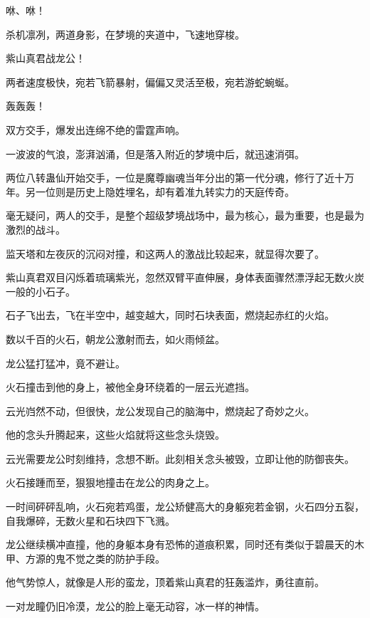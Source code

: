 
\begin{this_body}



咻、咻！

杀机凛冽，两道身影，在梦境的夹道中，飞速地穿梭。

紫山真君战龙公！

两者速度极快，宛若飞箭暴射，偏偏又灵活至极，宛若游蛇蜿蜒。

轰轰轰！

双方交手，爆发出连绵不绝的雷霆声响。

一波波的气浪，澎湃汹涌，但是落入附近的梦境中后，就迅速消弭。

两位八转蛊仙开始交手，一位是魔尊幽魂当年分出的第一代分魂，修行了近十万年。另一位则是历史上隐姓埋名，却有着准九转实力的天庭传奇。

毫无疑问，两人的交手，是整个超级梦境战场中，最为核心，最为重要，也是最为激烈的战斗。

监天塔和左夜灰的沉闷对撞，和这两人的激战比较起来，就显得次要了。

紫山真君双目闪烁着琉璃紫光，忽然双臂平直伸展，身体表面骤然漂浮起无数火炭一般的小石子。

石子飞出去，飞在半空中，越变越大，同时石块表面，燃烧起赤红的火焰。

数以千百的火石，朝龙公激射而去，如火雨倾盆。

龙公猛打猛冲，竟不避让。

火石撞击到他的身上，被他全身环绕着的一层云光遮挡。

云光岿然不动，但很快，龙公发现自己的脑海中，燃烧起了奇妙之火。

他的念头升腾起来，这些火焰就将这些念头烧毁。

云光需要龙公时刻维持，念想不断。此刻相关念头被毁，立即让他的防御丧失。

火石接踵而至，狠狠地撞击在龙公的肉身之上。

一时间砰砰乱响，火石宛若鸡蛋，龙公矫健高大的身躯宛若金钢，火石四分五裂，自我爆碎，无数火星和石块四下飞溅。

龙公继续横冲直撞，他的身躯本身有恐怖的道痕积累，同时还有类似于碧晨天的木甲、方源的鬼不觉之类的防护手段。

他气势惊人，就像是人形的蛮龙，顶着紫山真君的狂轰滥炸，勇往直前。

一对龙瞳仍旧冷漠，龙公的脸上毫无动容，冰一样的神情。


\end{this_body}
